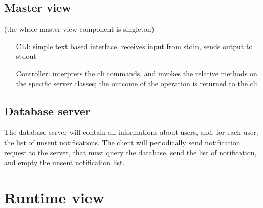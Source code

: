 	\subsection{Master view}
	(the whole master view component is singleton)
	\begin{itemize}
	  \item [CLI:] simple text based interface, receives input from stdin, sends output to stdout
	  \item [Controller:] interprets the cli commands, and invokes the relative methods on the specific server classes;
	  the outcome of the operation is returned to the cli.
	\end{itemize}
	\subsection{Database server}
	The database server will contain all informations about users, and, for each user, the list of unsent notifications.
	The client will periodically send notification request to the server, that must query the database, send the list of notification,
	and empty the unsent notification list.
\newpage
\section{Runtime view}
